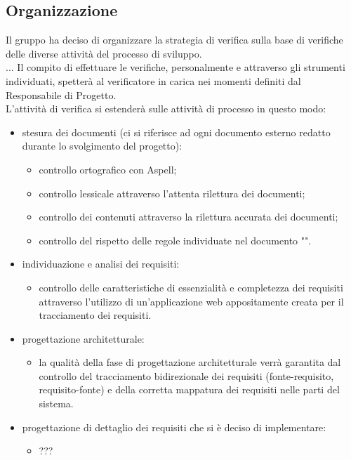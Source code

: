 \subsection{Organizzazione}
	Il gruppo \groupname ha deciso di organizzare la strategia di verifica sulla base  di verifiche delle diverse attività del processo di sviluppo.\\
	...
	Il compito di effettuare le verifiche, personalmente e attraverso gli strumenti individuati, spetterà al verificatore in carica nei momenti definiti dal Responsabile di Progetto.\\
	L'attività di verifica si estenderà sulle attività di processo in questo modo:
	\begin{itemize}
		\item stesura dei documenti (ci si riferisce ad ogni documento esterno redatto durante lo svolgimento del progetto):
			\begin{itemize}
				\item controllo ortografico con Aspell;
				\item controllo lessicale attraverso l'attenta rilettura dei documenti;
				\item controllo dei contenuti attraverso la rilettura accurata dei documenti;
				\item controllo del rispetto delle regole individuate nel documento "".
			\end{itemize}
		\item individuazione e analisi dei requisiti:
			\begin{itemize}
				\item controllo delle caratteristiche di essenzialità e completezza dei requisiti attraverso l'utilizzo di un'applicazione web appositamente creata per il tracciamento dei requisiti.
			\end{itemize}
		\item progettazione architetturale:
			\begin{itemize}
				\item la qualità della fase di progettazione architetturale verrà garantita dal controllo del tracciamento bidirezionale dei requisiti (fonte-requisito, requisito-fonte) e della corretta mappatura dei requisiti nelle parti del sistema.
			\end{itemize}
		\item progettazione di dettaglio dei requisiti che si è deciso di implementare: 
			\begin{itemize}
				\item ???

\end{itemize}
\end{itemize}
